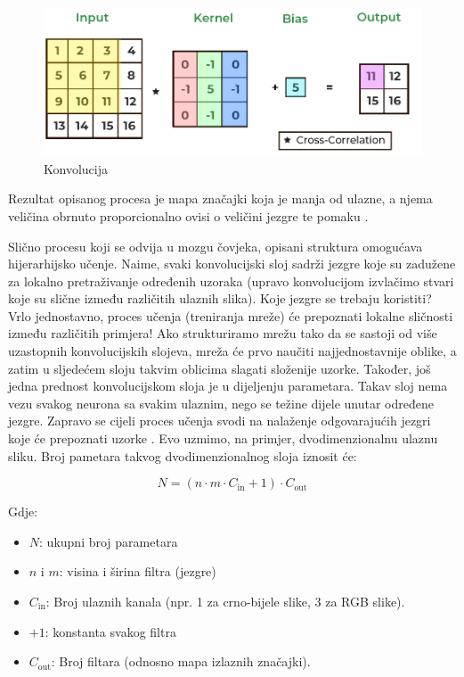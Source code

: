 \begin{figure}[htb]
      \centering
      \includegraphics[width=0.5\linewidth]{Chapters/neuronska_mreza/CNN/convolution.png} 
      \caption{Konvolucija \cite{convolution}}
      \label{pic:convolution}
\end{figure}

Rezultat opisanog procesa je mapa značajki koja je manja od ulazne, a njema veličina
obrnuto proporcionalno ovisi o veličini jezgre te pomaku \cite{cnn_whatis}. 

Slično procesu koji se odvija u mozgu čovjeka, opisani struktura omogućava hijerarhijsko učenje.
Naime, svaki konvolucijski sloj sadrži jezgre koje su zadužene za lokalno pretraživanje
određenih uzoraka (upravo konvolucijom izvlačimo stvari koje su slične između različitih
ulaznih slika). Koje jezgre se trebaju koristiti? Vrlo jednostavno, proces učenja (treniranja
mreže) će prepoznati lokalne sličnosti između različitih primjera! Ako strukturiramo mrežu
tako da se sastoji od više uzastopnih konvolucijskih slojeva, mreža će prvo naučiti najjednostavnije
oblike, a zatim u sljedećem sloju takvim oblicima slagati složenije uzorke. Također,
još jedna prednost konvolucijskom sloja je u dijeljenju parametara. Takav sloj nema vezu 
svakog neurona sa svakim ulaznim, nego se težine dijele unutar određene jezgre. Zapravo se
cijeli proces učenja svodi na nalaženje odgovarajućih jezgri koje će prepoznati uzorke \cite{pycodemates}.
Evo uzmimo, na primjer, dvodimenzionalnu ulaznu sliku. Broj pametara takvog dvodimenzionalnog
sloja iznosit će:

\begin{equation}
    N = (n \cdot m \cdot C_{\text{in}} + 1) \cdot C_{\text{out}}
\end{equation}

Gdje:
\begin{itemize}
    \item \(N\): ukupni broj parametara
    \item \(n\) i \(m\): visina i širina filtra (jezgre)
    \item \(C_{\text{in}}\): Broj ulaznih kanala (npr. 1 za crno-bijele slike, 3 za RGB slike).
    \item \(+1\): konstanta svakog filtra
    \item \(C_{\text{out}}\): Broj filtara (odnosno mapa izlaznih značajki).
\end{itemize}


